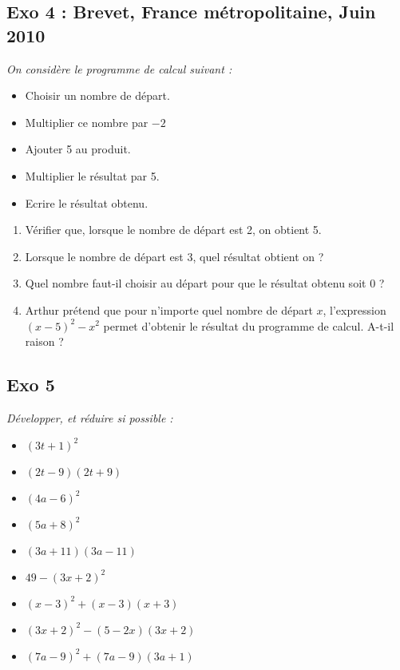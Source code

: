 \documentclass[10pt]{article}
\begin{document}
\subsection*{Exo 4 : Brevet, France métropolitaine, Juin 2010}
\begin{multicols}{2}
	\textit{On considère le programme de calcul suivant :}

	\begin{itemize}
		\item Choisir un nombre de départ.
		\item Multiplier ce nombre par $-2$
		\item Ajouter 5 au produit.
		\item Multiplier le résultat par 5.
		\item Ecrire le résultat obtenu.
	\end{itemize}

	\begin{enumerate}
		\item Vérifier que, lorsque le nombre de départ est 2, on obtient 5.
		\item Lorsque le nombre de départ est 3, quel résultat obtient on ?
		\item Quel nombre faut-il choisir au départ pour que le résultat obtenu soit 0 ?
		\item Arthur prétend que pour n’importe quel nombre de départ $x$, l’expression $(x-5)^{2} - x^{2}$ permet d’obtenir le résultat du programme de calcul. A-t-il raison ?
	\end{enumerate}
\end{multicols}

\subsection*{Exo 5}
\textit{Développer, et réduire si possible : }

\begin{multicols}{3}
\begin{itemize}[label=$\Diamond$]
\item $(3t + 1)^{2}$
\item $(2t - 9)(2t + 9)$
\item $(4a - 6)^{2}$
\item $(5a + 8)^{2}$
\item $(3a + 11)(3a - 11)$
\item $49 - (3x+ 2)^{2}$
\item $(x - 3)^{2} + (x - 3)(x + 3)$
\item $(3x + 2)^{2} - (5 - 2x)(3x+ 2)$
\item $(7a - 9)^{2} + (7a - 9)(3a + 1)$
\end{itemize}
\end{multicols}
\end{document}
